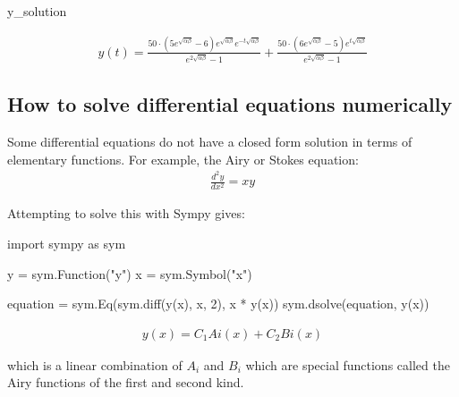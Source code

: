 \begin{pyin}
y_solution
\end{pyin}




\begin{equation*}
\begin{split}\displaystyle y{\left(t \right)} = \frac{50 \cdot \left(5 e^{\sqrt{\alpha \beta}} - 6\right) e^{\sqrt{\alpha \beta}} e^{- t \sqrt{\alpha \beta}}}{e^{2 \sqrt{\alpha \beta}} - 1} + \frac{50 \cdot \left(6 e^{\sqrt{\alpha \beta}} - 5\right) e^{t \sqrt{\alpha \beta}}}{e^{2 \sqrt{\alpha \beta}} - 1}\end{split}
\end{equation*}




\subsection{How to solve differential equations numerically}
\label{\detokenize{tools-for-mathematics/09-differential-equations/why/main:how-to-solve-differential-equations-numerically}}

Some differential equations do not have a closed form solution in terms of
elementary functions. For example, the Airy or Stokes equation:
\begin{equation*}
\begin{split}
\frac{d^2y}{dx^2} = xy
\end{split}
\end{equation*}

Attempting to solve this with Sympy gives:




\begin{pyin}
import sympy as sym

y = sym.Function("y")
x = sym.Symbol("x")

equation = sym.Eq(sym.diff(y(x), x, 2), x * y(x))
sym.dsolve(equation, y(x))
\end{pyin}




\begin{equation*}
\begin{split}\displaystyle y{\left(x \right)} = C_{1} Ai\left(x\right) + C_{2} Bi\left(x\right)\end{split}
\end{equation*}




which is a linear combination of \(A_i\) and \(B_i\) which are special functions
called the Airy functions of the first and second kind.



